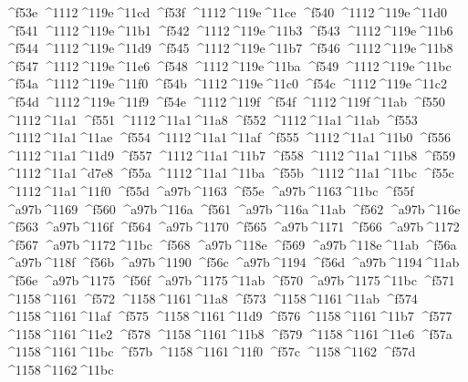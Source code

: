 \checkit ^^^^f53e ^^^^1112^^^^119e^^^^11cd
\checkit ^^^^f53f ^^^^1112^^^^119e^^^^11ce
\checkit ^^^^f540 ^^^^1112^^^^119e^^^^11d0
\checkit ^^^^f541 ^^^^1112^^^^119e^^^^11b1
\checkit ^^^^f542 ^^^^1112^^^^119e^^^^11b3
\checkit ^^^^f543 ^^^^1112^^^^119e^^^^11b6
\checkit ^^^^f544 ^^^^1112^^^^119e^^^^11d9
\checkit ^^^^f545 ^^^^1112^^^^119e^^^^11b7
\checkit ^^^^f546 ^^^^1112^^^^119e^^^^11b8
\checkit ^^^^f547 ^^^^1112^^^^119e^^^^11e6
\checkit ^^^^f548 ^^^^1112^^^^119e^^^^11ba
\checkit ^^^^f549 ^^^^1112^^^^119e^^^^11bc
\checkit ^^^^f54a ^^^^1112^^^^119e^^^^11f0
\checkit ^^^^f54b ^^^^1112^^^^119e^^^^11c0
\checkit ^^^^f54c ^^^^1112^^^^119e^^^^11c2
\checkit ^^^^f54d ^^^^1112^^^^119e^^^^11f9
\checkit ^^^^f54e ^^^^1112^^^^119f
\checkit ^^^^f54f ^^^^1112^^^^119f^^^^11ab
\checkit ^^^^f550 ^^^^1112^^^^11a1
\checkit ^^^^f551 ^^^^1112^^^^11a1^^^^11a8
\checkit ^^^^f552 ^^^^1112^^^^11a1^^^^11ab
\checkit ^^^^f553 ^^^^1112^^^^11a1^^^^11ae
\checkit ^^^^f554 ^^^^1112^^^^11a1^^^^11af
\checkit ^^^^f555 ^^^^1112^^^^11a1^^^^11b0
\checkit ^^^^f556 ^^^^1112^^^^11a1^^^^11d9
\checkit ^^^^f557 ^^^^1112^^^^11a1^^^^11b7
\checkit ^^^^f558 ^^^^1112^^^^11a1^^^^11b8
\checkit ^^^^f559 ^^^^1112^^^^11a1^^^^d7e8
\checkit ^^^^f55a ^^^^1112^^^^11a1^^^^11ba
\checkit ^^^^f55b ^^^^1112^^^^11a1^^^^11bc
\checkit ^^^^f55c ^^^^1112^^^^11a1^^^^11f0
\checkit ^^^^f55d ^^^^a97b^^^^1163
\checkit ^^^^f55e ^^^^a97b^^^^1163^^^^11bc
\checkit ^^^^f55f ^^^^a97b^^^^1169
\checkit ^^^^f560 ^^^^a97b^^^^116a
\checkit ^^^^f561 ^^^^a97b^^^^116a^^^^11ab
\checkit ^^^^f562 ^^^^a97b^^^^116e
\checkit ^^^^f563 ^^^^a97b^^^^116f
\checkit ^^^^f564 ^^^^a97b^^^^1170
\checkit ^^^^f565 ^^^^a97b^^^^1171
\checkit ^^^^f566 ^^^^a97b^^^^1172
\checkit ^^^^f567 ^^^^a97b^^^^1172^^^^11bc
\checkit ^^^^f568 ^^^^a97b^^^^118e
\checkit ^^^^f569 ^^^^a97b^^^^118e^^^^11ab
\checkit ^^^^f56a ^^^^a97b^^^^118f
\checkit ^^^^f56b ^^^^a97b^^^^1190
\checkit ^^^^f56c ^^^^a97b^^^^1194
\checkit ^^^^f56d ^^^^a97b^^^^1194^^^^11ab
\checkit ^^^^f56e ^^^^a97b^^^^1175
\checkit ^^^^f56f ^^^^a97b^^^^1175^^^^11ab
\checkit ^^^^f570 ^^^^a97b^^^^1175^^^^11bc
\checkit ^^^^f571 ^^^^1158^^^^1161
\checkit ^^^^f572 ^^^^1158^^^^1161^^^^11a8
\checkit ^^^^f573 ^^^^1158^^^^1161^^^^11ab
\checkit ^^^^f574 ^^^^1158^^^^1161^^^^11af
\checkit ^^^^f575 ^^^^1158^^^^1161^^^^11d9
\checkit ^^^^f576 ^^^^1158^^^^1161^^^^11b7
\checkit ^^^^f577 ^^^^1158^^^^1161^^^^11e2
\checkit ^^^^f578 ^^^^1158^^^^1161^^^^11b8
\checkit ^^^^f579 ^^^^1158^^^^1161^^^^11e6
\checkit ^^^^f57a ^^^^1158^^^^1161^^^^11bc
\checkit ^^^^f57b ^^^^1158^^^^1161^^^^11f0
\checkit ^^^^f57c ^^^^1158^^^^1162
\checkit ^^^^f57d ^^^^1158^^^^1162^^^^11bc
